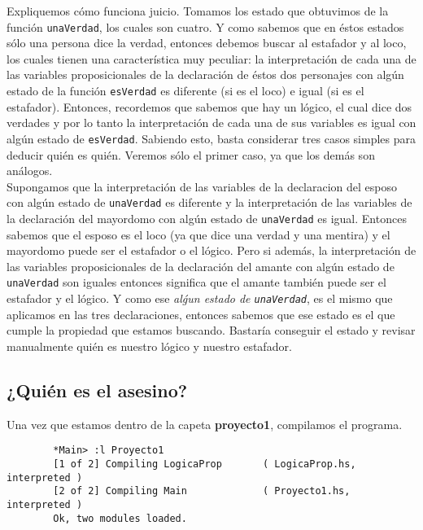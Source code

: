 \documentclass[letterpaper,12pt]{article}
\begin{document}
\begin{itemize}
        Expliquemos cómo funciona juicio. Tomamos los estado que obtuvimos de 
        la función \texttt{unaVerdad}, los cuales son cuatro. Y como sabemos 
        que en éstos estados sólo una persona dice la verdad, entonces debemos
        buscar al estafador y al loco, los cuales tienen una característica muy
        peculiar: la interpretación de cada una de las variables 
        proposicionales de la declaración de éstos dos personajes con algún 
        estado de la función \texttt{esVerdad} es diferente (si es el loco) e 
        igual (si es el estafador). Entonces, recordemos que sabemos que hay 
        un lógico, el cual dice dos verdades y por lo tanto la interpretación 
        de cada una de sus variables es igual con algún estado de 
        \texttt{esVerdad}. Sabiendo esto, basta considerar tres casos simples
        para deducir quién es quién. Veremos sólo el primer caso, ya que los
        demás son análogos. \\
        Supongamos que la interpretación de las variables de la declaracion del
        esposo con algún estado de \texttt{unaVerdad} es diferente y la 
        interpretación de las variables de la declaración del mayordomo con 
        algún estado de \texttt{unaVerdad} es igual. Entonces sabemos que el 
        esposo es el loco (ya que dice una verdad y una mentira) y el mayordomo 
        puede ser el estafador o el lógico. Pero si además, la interpretación de
        las variables proposicionales de la declaración del amante con algún 
        estado de \texttt{unaVerdad} son iguales entonces significa que el 
        amante también puede ser el estafador y el lógico. Y como ese 
        \textit{alǵun estado de \texttt{unaVerdad}}, es el mismo que aplicamos
        en las tres declaraciones, entonces sabemos que ese estado es el que 
        cumple la propiedad que estamos buscando. Bastaría conseguir el estado 
        y revisar manualmente quién es nuestro lógico y nuestro estafador. 
    \end{itemize}

    \subsection{¿Quién es el asesino?}
    Una vez que estamos dentro de la capeta \textbf{proyecto1}, compilamos el 
    programa. 
    \begin{lstlisting}
        *Main> :l Proyecto1
        [1 of 2] Compiling LogicaProp       ( LogicaProp.hs, interpreted )
        [2 of 2] Compiling Main             ( Proyecto1.hs, interpreted )
        Ok, two modules loaded.
    \end{lstlisting}
\end{document}
